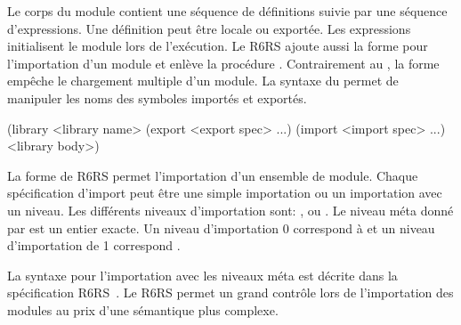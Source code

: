 Le corps du module contient une séquence de définitions suivie par une séquence
d'expressions. Une définition peut être locale ou exportée. Les expressions
initialisent le module lors de l'exécution.  Le R6RS ajoute aussi la forme
 pour l'importation d'un module et enlève la procédure
.  Contrairement au , la forme 
empêche le chargement multiple d'un module.  La syntaxe du 
permet de manipuler les noms des symboles importés et exportés.\\
\begin{center}
  \begin{mplisting}{0.5}
(library <library name>
  (export <export spec> ...)
  (import <import spec> ...)
  <library body>)
\end{mplisting}
\end{center}

La forme  de R6RS permet l'importation d'un ensemble de module.
Chaque spécification d'import  peut être une simple
importation ou un importation avec un niveau. Les différents niveaux d'importation sont:
,  ou .  Le niveau méta
donné par  est un entier exacte. Un niveau d'importation 0
correspond à  et un niveau d'importation de 1 correspond
.



La syntaxe pour l'importation avec les niveaux méta est décrite dans la
spécification R6RS~\cite{Scheme:R6RS}. Le  R6RS permet un grand
contrôle lors de l'importation des modules au prix d'une sémantique plus complexe.

